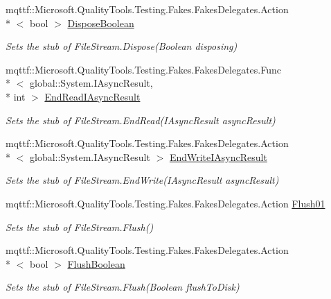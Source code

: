 \begin{DoxyCompactItemize}
mqttf\-::\-Microsoft.\-Quality\-Tools.\-Testing.\-Fakes.\-Fakes\-Delegates.\-Action\\*
$<$ bool $>$ \hyperlink{class_system_1_1_i_o_1_1_fakes_1_1_stub_file_stream_aa214bd4276d6b786645aabc9203d3489}{Dispose\-Boolean}
\begin{DoxyCompactList}\small\item\em Sets the stub of File\-Stream.\-Dispose(\-Boolean disposing)\end{DoxyCompactList}\item 
mqttf\-::\-Microsoft.\-Quality\-Tools.\-Testing.\-Fakes.\-Fakes\-Delegates.\-Func\\*
$<$ global\-::\-System.\-I\-Async\-Result, \\*
int $>$ \hyperlink{class_system_1_1_i_o_1_1_fakes_1_1_stub_file_stream_ab2b103204446d5f8da4c679e2c02fdbd}{End\-Read\-I\-Async\-Result}
\begin{DoxyCompactList}\small\item\em Sets the stub of File\-Stream.\-End\-Read(\-I\-Async\-Result async\-Result)\end{DoxyCompactList}\item 
mqttf\-::\-Microsoft.\-Quality\-Tools.\-Testing.\-Fakes.\-Fakes\-Delegates.\-Action\\*
$<$ global\-::\-System.\-I\-Async\-Result $>$ \hyperlink{class_system_1_1_i_o_1_1_fakes_1_1_stub_file_stream_a2d8b598bee66754d861167d9a7779c1d}{End\-Write\-I\-Async\-Result}
\begin{DoxyCompactList}\small\item\em Sets the stub of File\-Stream.\-End\-Write(\-I\-Async\-Result async\-Result)\end{DoxyCompactList}\item 
mqttf\-::\-Microsoft.\-Quality\-Tools.\-Testing.\-Fakes.\-Fakes\-Delegates.\-Action \hyperlink{class_system_1_1_i_o_1_1_fakes_1_1_stub_file_stream_ac510c42dbc23f293b98edb214a6b0207}{Flush01}
\begin{DoxyCompactList}\small\item\em Sets the stub of File\-Stream.\-Flush()\end{DoxyCompactList}\item 
mqttf\-::\-Microsoft.\-Quality\-Tools.\-Testing.\-Fakes.\-Fakes\-Delegates.\-Action\\*
$<$ bool $>$ \hyperlink{class_system_1_1_i_o_1_1_fakes_1_1_stub_file_stream_aa2edbc013e71dbae8459efc0f7515be2}{Flush\-Boolean}
\begin{DoxyCompactList}\small\item\em Sets the stub of File\-Stream.\-Flush(\-Boolean flush\-To\-Disk)\end{DoxyCompactList}\item 

\end{DoxyCompactItemize}

